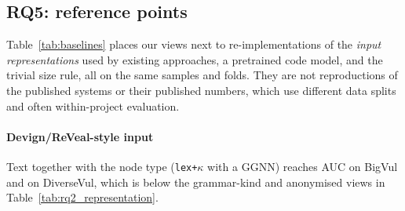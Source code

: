 \subsection{RQ5: reference points}
\label{sec:rq_reference}

Table~\ref{tab:baselines} places our views next to re-implementations of the
\emph{input representations} used by existing approaches, a pretrained code
model, and the trivial size rule, all on the same samples and folds.
They are not reproductions of the published systems or their published numbers,
which use different data splits and often within-project evaluation.



\paragraph{Devign/ReVeal-style input} Text together with the node type
(\texttt{lex+$\kappa$} with a GGNN) reaches AUC \mBvGgnnLexKindAuc{} on BigVul
and \mDvGgnnLexKindAuc{} on DiverseVul, which is below the grammar-kind and anonymised views in
Table~\ref{tab:rq2_representation}.


